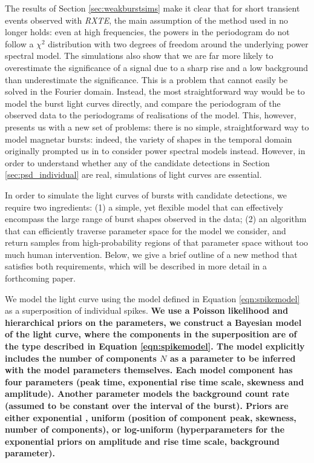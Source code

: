 \documentclass[numberedappendix]{emulateapj}
\newcommand{\project}[1]{\textsl{#1}}
\newcommand{\rxte}{\project{RXTE}}
\begin{document}
The results of Section \ref{sec:weakburstsims} make it clear that for short transient events observed with \rxte, the main assumption of the method used in \citet{huppenkothen2013} no longer holds: even at high frequencies, the powers in the periodogram do not follow a $\chi^2$ distribution with two degrees of freedom around the underlying power spectral model. The simulations also show that we are far more likely to overestimate the significance of a signal due to a sharp rise and a low background than underestimate the significance. This is a problem that cannot easily be solved in the Fourier domain. Instead, the most straightforward way would be to model the burst light curves directly, and compare the periodogram of the observed data to the periodograms of realisations of the model. This, however, presents us with a new set of problems: there is no simple, straightforward way to model magnetar bursts: indeed, the variety of shapes in the temporal domain originally prompted us in \citet{huppenkothen2013} to consider power spectral models instead. However, in order to understand whether any of the candidate detections in Section \ref{sec:psd_individual} are real, simulations of light curves are essential. 

In order to simulate the light curves of bursts with candidate detections, we require two ingredients: (1) a simple, yet flexible model that can effectively encompass the large range of burst shapes observed in the data; (2) an algorithm that can efficiently traverse parameter space for the model we consider, and return samples from high-probability regions of that parameter space without too much human intervention. Below, we give a brief outline of a new method that satisfies both requirements, which will be described in more detail in a forthcoming paper.

We model the light curve using the model defined in Equation \ref{eqn:spikemodel} as a superposition of individual spikes. \textbf{We use a Poisson likelihood and hierarchical priors on the parameters, we construct a Bayesian model of the light curve, where the components in the superposition are of the type described in Equation \ref{eqn:spikemodel}. The model explicitly includes the number of components $N$ as a parameter to be inferred with the model parameters themselves. Each model component has four parameters (peak time, exponential rise time scale, skewness and amplitude). Another parameter models the background count rate (assumed to be constant over the interval of the burst). Priors are either exponential \citep[amplitude, rise time scale; see also][]{skilling1998}, uniform (position of component peak, skewness, number of components), or log-uniform (hyperparameters for the exponential priors on amplitude and rise time scale, background parameter). }
\end{document}
